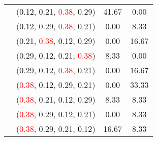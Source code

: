 \documentclass[10pt,a4paper]{report}
\begin{document}
\begin{center}
\begin{longtable}{clcc}
			&(\textcolor{black}{0.12}, 0.21, \textcolor{red}{0.38}, 0.29)&41.67&0.00\\
			&(\textcolor{black}{0.12}, 0.29, \textcolor{red}{0.38}, 0.21)&0.00&8.33\\
			&(0.21, \textcolor{red}{0.38}, \textcolor{black}{0.12}, 0.29)&0.00&16.67\\
			&(0.29, \textcolor{black}{0.12}, 0.21, \textcolor{red}{0.38})&8.33&0.00\\
			&(0.29, \textcolor{black}{0.12}, \textcolor{red}{0.38}, 0.21)&0.00&16.67\\
			&(\textcolor{red}{0.38}, \textcolor{black}{0.12}, 0.29, 0.21)&0.00&33.33\\
			&(\textcolor{red}{0.38}, 0.21, \textcolor{black}{0.12}, 0.29)&8.33&8.33\\
			&(\textcolor{red}{0.38}, 0.29, \textcolor{black}{0.12}, 0.21)&0.00&8.33\\
			&(\textcolor{red}{0.38}, 0.29, 0.21, \textcolor{black}{0.12})&16.67&8.33\\
		\bottomrule
	\end{longtable}
\end{center}
\end{document}
